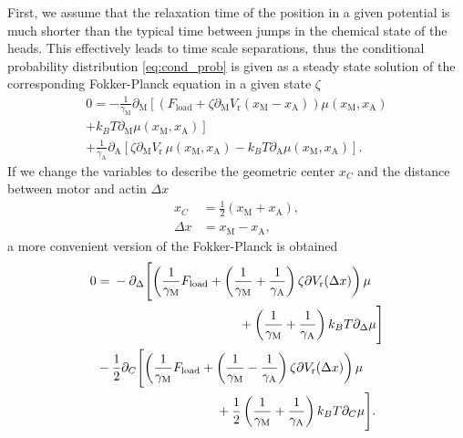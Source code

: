 \documentclass[aps,pre,twocolumn,showpacs,showkeys,superscriptaddress,floatfix]{revtex4-1}
\begin{document}
First, we assume that the relaxation time of the position in a given potential is much shorter than the typical time between jumps in the chemical state of the heads. 
This effectively leads to time scale separations,
thus the conditional probability distribution \eqref{eq:cond_prob} is given as a steady state solution of the corresponding Fokker-Planck equation in a given state $\zeta$
\begin{multline*}
0 = - \frac{1}{\gamma_\text{M}} \partial_\text{M} \left[ \left( F_\text{load} + \zeta \partial_\text{M} V_\text{r}( x_\text{M} - x_\text{A} ) \right) \mu\left( x_\text{M}, x_\text{A} \right)
\right. \\ \left.
+ k_B T \partial_\text{M} \mu\left( x_\text{M}, x_\text{A} \right) \right] 
\\
+ \frac{1}{\gamma_\text{A}} \partial_\text{A} \left[ 
\zeta \partial_\text{M} V_\text{r} \, \mu( x_\text{M}, x_\text{A} ) 
- k_B T \partial_\text{A} \mu\left( x_\text{M}, x_\text{A} \right) 
\right] .
\end{multline*}
If we change the variables to describe the geometric center $x_C$ and the distance between motor and actin $\Delta x$
\begin{align*}
x_C &= \frac{1}{2} ( x_\text{M} + x_\text{A} ) , \\
\Delta x &= x_\text{M} - x_\text{A}, 
\end{align*}
a more convenient version of the Fokker-Planck is obtained
\begin{align*}
0 &= \begin{multlined}[t][.4\textwidth]
- \partial_\Delta \Biggl[ 
\left( \frac{1}{\gamma_\text{M}} F_\text{load} + \left( \frac{1}{\gamma_\text{M}} + \frac{1}{\gamma_\text{A}} \right) \zeta \partial V_\text{r}( \Delta x ) \right) \mu
\\ 
+ \left( \frac{1}{\gamma_\text{M}} + \frac{1}{\gamma_\text{A}} \right) k_B T \partial_\Delta \mu 
\Biggr] 
\end{multlined}
\\
&- \begin{multlined}[t][.4\textwidth]
\frac{1}{2} \partial_C \Biggl[
\left( \frac{1}{\gamma_\text{M}} F_\text{load} + \left( \frac{1}{\gamma_\text{M}} - \frac{1}{\gamma_\text{A}} \right) \zeta \partial V_\text{r}( \Delta x ) \right) \mu
\\
+ \frac{1}{2} \left( \frac{1}{\gamma_\text{M}} + \frac{1}{\gamma_\text{A}} \right) k_B T \partial_C \mu 
\Biggr] .
\end{multlined}
\end{align*}
\end{document}
